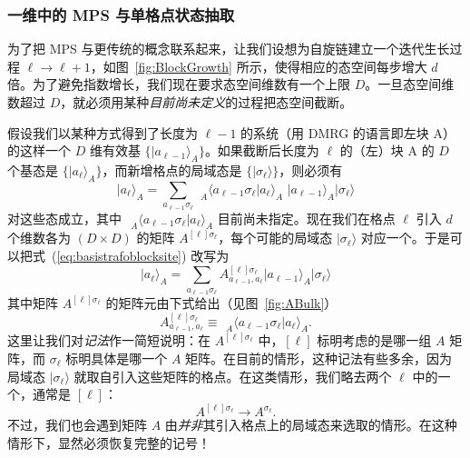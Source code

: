 \documentclass[a4paper,10pt,oneside,onecolumn,1p,times]{elsarticle}
\newcommand{\ket}[1]{\mbox{$| #1  \rangle$}}
\newcommand{\braket}[2]{\mbox{$\langle #1  | #2 \rangle$}} 	%
\begin{document}
\subsubsection{一维中的 MPS 与单格点状态抽取}
\label{subsubsec:MPSsinglesitedecimation}

为了把 MPS 与更传统的概念联系起来，让我们设想为自旋链建立一个迭代生长过程 $\ell \rightarrow \ell + 1$，如图~\ref{fig:BlockGrowth} 所示，使得相应的态空间每步增大 $d$ 倍。为了避免指数增长，我们现在要求态空间维数有一个上限 $D$。一旦态空间维数超过 $D$，就必须用某种{\em 目前尚未定义}的过程把态空间截断。

假设我们以某种方式得到了长度为 $\ell-1$ 的系统（用 DMRG 的语言即左块 A）的这样一个 $D$ 维有效基 $\{ \ket{a_{\ell-1}}_A \}$。如果截断后长度为 $\ell$ 的（左）块 A 的 $D$ 个基态是 $\{ \ket{a_{\ell}}_A \}$，而新增格点的局域态是 $\{ \ket{\sigma_\ell} \}$，则必须有
\begin{equation}
\ket{a_\ell}_A = \sum_{a_{\ell-1}\sigma_\ell} \phantom\langle _A \braket{a_{\ell-1}\sigma_\ell}{a_\ell}_A \,\, \ket{a_{\ell-1}}_A\ket{\sigma_\ell}
\label{eq:basistrafoblocksite}
\end{equation}
对这些态成立，其中 $\phantom\langle _A \braket{a_{\ell-1}\sigma_\ell}{a_\ell}_A$ 目前尚未指定。现在我们在格点 $\ell$ 引入 $d$ 个维数各为 $(D \times D)$ 的矩阵 $A^{[\ell]\sigma_\ell}$，每个可能的局域态 $\ket{\sigma_\ell}$ 对应一个。于是可以把式~(\ref{eq:basistrafoblocksite}) 改写为
\begin{equation}
\ket{a_\ell}_A = \sum_{a_{\ell-1}\sigma_\ell} A^{[\ell]\sigma_\ell}_{a_{\ell-1}, a_\ell} \ket{a_{\ell-1}}_A  \ket{\sigma_\ell} 
\label{eq:matrixbyRG}
\end{equation}
其中矩阵 $A^{[\ell]\sigma_\ell}$ 的矩阵元由下式给出（见图~\ref{fig:ABulk}）
\begin{equation}
A^{[\ell]\sigma_\ell}_{a_{\ell-1}, a_\ell} \equiv \phantom\langle_A \braket{a_{\ell-1}\sigma_\ell}{a_\ell}_A. 
\label{eq:Amatrixelements}
\end{equation}
这里让我们对{\em 记法}作一简短说明：在 $A^{[\ell]\sigma_\ell}$ 中，$[\ell]$ 标明考虑的是哪一组 $A$ 矩阵，而 $\sigma_\ell$ 标明具体是哪一个 $A$ 矩阵。在目前的情形，这种记法有些多余，因为局域态 $\ket{\sigma_\ell}$ 就取自引入这些矩阵的格点。在这类情形，我们略去两个 $\ell$ 中的一个，通常是 $[\ell]$：
\begin{equation}
A^{[\ell]\sigma_\ell} \rightarrow A^{\sigma_\ell} .
\end{equation}
不过，我们也会遇到矩阵 $A$ 由{\em 并非}其引入格点上的局域态来选取的情形。在这种情形下，显然必须恢复完整的记号！
\end{document}
